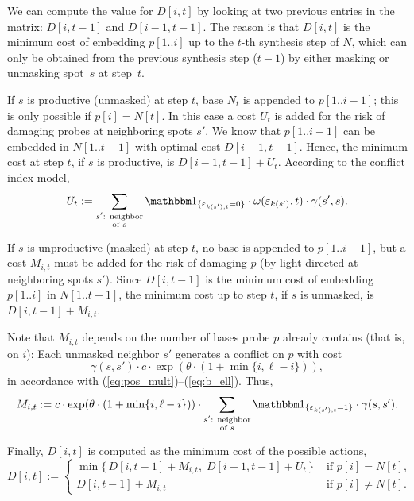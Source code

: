 We can compute the value for $D[i,t]$ by looking at two previous entries in the
matrix: $D[i,t-1]$ and $D[i-1,t-1]$. The reason is that $D[i,t]$ is the minimum
cost of embedding $p[1..i]$ up to the $t$-th synthesis step of $N$, which can
only be obtained from the previous synthesis step ($t-1$) by either masking or
unmasking spot~$s$ at step~$t$.

If $s$ is productive (unmasked) at step $t$, base $N_t$ is appended to
$p[1..i-1]$; this is only possible if $p[i]=N[t]$. In this case a cost $U_t$ is
added for the risk of damaging probes at neighboring spots $s'$. We know that
$p[1..i-1]$ can be embedded in $N[1..t-1]$ with optimal cost $D[i-1,t-1]$.
Hence, the minimum cost at step $t$, if $s$ is productive, is $D[i-1,t-1] +
U_t$.  According to the conflict index model,
\begin{equation}
\label{eq:ospe_ucost}
U_t := \sum_{\substack{s'\text{: neighbor}\\\text{of } s}}
  \Ind{\eps_{k(s'),t}=0}
  \cdot \omega(\eps_{k(s')},t)
  \cdot \gamma(s',s).
\end{equation}

If $s$ is unproductive (masked) at step $t$, no base is appended to $p[1..i-1]$,
but a cost $M_{i,t}$ must be added for the risk of damaging $p$ (by light
directed at neighboring spots $s'$). Since $D[i,t-1]$ is the minimum cost of
embedding $p[1..i]$ in $N[1..t-1]$, the minimum cost up to step $t$, if $s$ is
unmasked, is $D[i,t-1] + M_{i,t}$.

Note that $M_{i,t}$ depends on the number of bases probe $p$ already contains
(that is, on $i$): Each unmasked neighbor $s'$ generates a conflict on $p$ with
cost
\[
\gamma(s,s') \cdot c \cdot \exp(\theta\cdot (1+\min\{i,\ell-i\})),
\]
in accordance with (\ref{eq:pos_mult})--(\ref{eq:b_ell}). Thus,
\begin{equation}
\label{eq:ospe_mcost}
M_{i,t} := c \cdot \exp(\theta\cdot (1+\min\{i,\ell-i\})) \cdot
\sum_{\substack{s'\text{: neighbor}\\\text{of } s}}
\Ind{\eps_{k(s'),t}=1}  \cdot \gamma(s,s').
\end{equation}

Finally, $D[i,t]$ is computed as the minimum cost of the possible actions,
\[
D[i,t] := \begin{cases}
  \min \{\, D[i,t-1] + M_{i,t},\;  D[i-1,t-1] + U_t \,\}
  & \text{ if $p[i]=N[t]$,}\\
  D[i,t-1] + M_{i,t}
  & \text{ if $p[i]\neq N[t]$.}
  \end{cases}
\]

